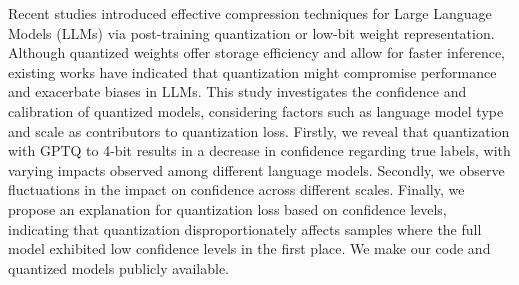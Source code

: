 Recent studies introduced effective compression techniques for Large Language Models (LLMs) via post-training quantization or low-bit weight representation.  Although quantized weights offer storage efficiency and allow for faster inference, existing works have indicated that quantization might compromise performance and exacerbate biases in LLMs. This study investigates the confidence and calibration of quantized models, considering factors such as language model type and scale as contributors to quantization loss. Firstly, we reveal that quantization with GPTQ to 4-bit results in a decrease in confidence regarding true labels, with varying impacts observed among different language models.  Secondly, we observe fluctuations in the impact on confidence across different scales.  Finally, we propose an explanation for quantization loss based on confidence levels, indicating that quantization disproportionately affects samples where the full model exhibited low confidence levels in the first place. We make our code and quantized models publicly available.